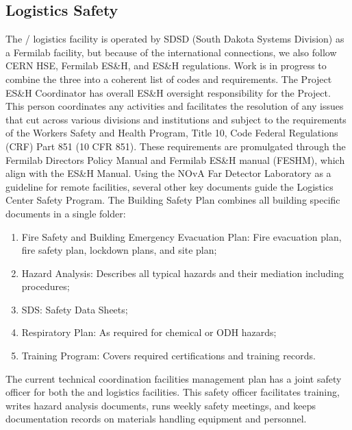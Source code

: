 \subsection{Logistics Safety}
\label{sec:fdsp-tc-log-safety}

The / logistics facility is operated by SDSD (South Dakota Systems Division)  as a Fermilab facility, but because of the international connections, we also follow CERN HSE, Fermilab ES\&H, and  ES\&H regulations.  Work is in progress to combine the three into a coherent list of codes and requirements. The  Project ES\&H Coordinator has overall ES\&H oversight responsibility for the  Project.  This person coordinates any activities and facilitates the resolution of any issues that cut across various divisions and institutions and subject to the requirements of the  Workers Safety and Health Program, Title 10, Code Federal Regulations (CRF) Part 851 (10 CFR 851). These requirements are promulgated through the Fermilab Directors Policy Manual and Fermilab ES\&H manual (FESHM), which align with the  ES\&H Manual. 
Using the NOvA Far Detector Laboratory as a guideline for remote facilities, several other key documents guide the Logistics Center Safety Program.  The Building Safety Plan combines all building specific documents in a single folder:

\begin{enumerate}
\item	Fire Safety and Building Emergency Evacuation Plan: Fire evacuation plan, fire safety plan,  lockdown plans, and site plan;
\item	Hazard Analysis: Describes all typical hazards and their mediation including procedures; 
\item	SDS: Safety Data Sheets;
\item	Respiratory Plan: As required for chemical or ODH hazards;
\item	Training Program: Covers required certifications and  training records.
\end{enumerate}

The current technical coordination facilities management plan has a joint safety officer for both the  and logistics facilities. This safety officer facilitates training, writes hazard analysis documents, runs weekly safety meetings, and keeps documentation records on materials handling equipment and personnel. 

